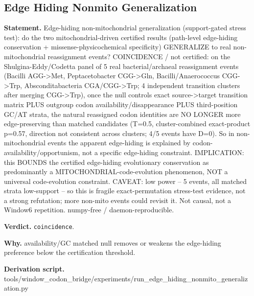 \subsection{Edge Hiding Nonmito Generalization}\label{sec:bridge-edge-hiding-nonmito-generalization}
\textbf{Statement.} Edge-hiding non-mitochondrial generalization (support-gated stress test): do the two
mitochondrial-driven certified results (path-level edge-hiding conservation +
missense-physicochemical specificity) GENERALIZE to real non-mitochondrial reassignment events?
COINCIDENCE / not certified: on the Shulgina-Eddy/Codetta panel of 5 real bacterial/archaeal
reassignment events (Bacilli AGG->Met, Peptacetobacter CGG->Gln, Bacilli/Anaerococcus CGG->Trp,
Absconditabacteria CGA/CGG->Trp; 4 independent transition clusters after merging CGG->Trp), once the
null controls exact source->target transition matrix PLUS outgroup codon availability/disappearance
PLUS third-position GC/AT strata, the natural reassigned codon identities are NO LONGER more
edge-preserving than matched candidates (T=0.5, cluster-combined exact-product p=0.57, direction not
consistent across clusters; 4/5 events have D=0). So in non-mitochondrial events the apparent
edge-hiding is explained by codon-availability/opportunism, not a specific edge-hiding constraint.
IMPLICATION: this BOUNDS the certified edge-hiding evolutionary conservation as predominantly a
MITOCHONDRIAL-code-evolution phenomenon, NOT a universal code-evolution constraint. CAVEAT: low
power -- 5 events, all matched strata low-support -- so this is fragile exact-permutation
stress-test evidence, not a strong refutation; more non-mito events could revisit it. Not causal,
not a Window6 repetition. numpy-free / daemon-reproducible.

\textbf{Verdict.} \texttt{coincidence}.

\textbf{Why.} availability/GC matched null removes or weakens the edge-hiding preference below the certification
threshold.

\textbf{Derivation script.} tools/window\_codon\_bridge/experiments/run\_edge\_hiding\_nonmito\_generalization.py

